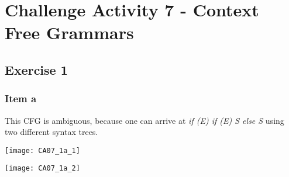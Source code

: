 \setcounter{section}{6}
\section{Challenge Activity 7 - Context Free Grammars}
\subsection{Exercise 1}%
{
\renewcommand{\thesubsubsection}{\thesubsection\alph{subsubsection}}
\subsubsection{Item a}
This CFG is ambiguous, because one can arrive at \textit{if (E) if (E) S else S} using two different syntax trees.
\begin{center}
\begin{minipage}{0.45\textwidth}
	\begin{center} \texttt{[image: CA07\_1a\_1]} \end{center}
\end{minipage}%
\begin{minipage}{0.40\textwidth}
	\begin{center} \texttt{[image: CA07\_1a\_2]} \end{center}
\end{minipage}
\end{center}
}
